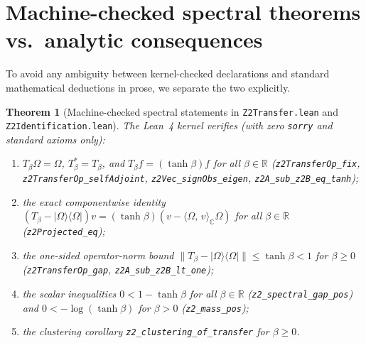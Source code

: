\documentclass[11pt]{article}
\newtheorem{theorem}{Theorem}[section]
\theoremstyle{remark}
\theoremstyle{definition}
\newcommand{\lean}[1]{\texttt{#1}}
\newcommand{\R}{\mathbb{R}}
\newcommand{\C}{\mathbb{C}}
\newcommand{\Om}{\Omega}
\newcommand{\inn}[2]{\langle #1,\, #2\rangle_{\C}}
\newcommand{\ket}[1]{|#1\rangle}
\newcommand{\bra}[1]{\langle #1|}
\begin{document}
\section{Machine-checked spectral theorems vs.\ analytic consequences}\label{sec:spectral}

To avoid any ambiguity between kernel-checked declarations and standard mathematical
deductions in prose, we separate the two explicitly.

\begin{theorem}[Machine-checked spectral statements in \texttt{Z2Transfer.lean} and \texttt{Z2Identification.lean}]
\label{thm:lean-spectral}
The Lean~4 kernel verifies (with zero \texttt{sorry} and standard axioms only):
\begin{enumerate}
  \item $T_\beta\Om = \Om$, $T_\beta^* = T_\beta$, and $T_\beta f = (\tanh\beta)f$ for all
  $\beta \in \R$ (\lean{z2TransferOp\_fix}, \lean{z2TransferOp\_selfAdjoint},
  \lean{z2Vec\_signObs\_eigen}, \lean{z2A\_sub\_z2B\_eq\_tanh});
  \item the exact componentwise identity
  $(T_\beta - \ket{\Om}\bra{\Om})v = (\tanh\beta)(v - \inn{\Om}{v}\Om)$ for all $\beta \in \R$
  (\lean{z2Projected\_eq});
  \item the one-sided operator-norm bound $\|T_\beta - \ket{\Om}\bra{\Om}\| \le \tanh\beta < 1$
  for $\beta \ge 0$ (\lean{z2TransferOp\_gap}, \lean{z2A\_sub\_z2B\_lt\_one});
  \item the scalar inequalities $0 < 1 - \tanh\beta$ for all $\beta \in \R$
  (\lean{z2\_spectral\_gap\_pos}) and $0 < -\log(\tanh\beta)$ for $\beta > 0$
  (\lean{z2\_mass\_pos});
  \item the clustering corollary \lean{z2\_clustering\_of\_transfer} for $\beta \ge 0$.
\end{enumerate}
\end{theorem}
\end{document}
